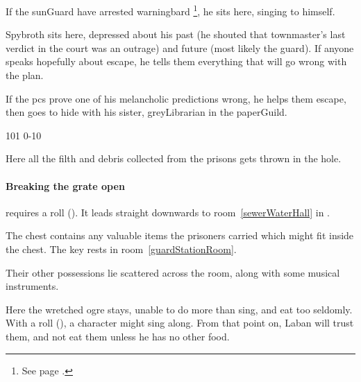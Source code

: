 \begin{multicols}{2}


If the \gls{sunGuard} have arrested \gls{warningbard}%
\footnote{See page \pageref{warningbard}.},
he sits here, singing to himself.


Spybroth sits here, depressed about his past (he shouted that \gls{townmaster}'s last verdict in the \gls{court} was an outrage) and future (most likely the \gls{guard}).
If anyone speaks hopefully about escape, he tells them everything that will go wrong with the plan.

If the \glspl{pc} prove one of his melancholic predictions wrong, he helps them escape, then goes to hide with his sister, \gls{greyLibrarian} in the \gls{paperGuild}.


%
  {{1}{0}{1}}%
  {{0}{-1}{0}}%
  {%
  }%
  {}%
  {\lootSmall}%
  {}%

\label{spyBroth}


Here all the filth and debris collected from the prisons gets thrown in the hole.

\paragraph{Breaking the grate open}
requires a  roll (\tn[10]).
It leads straight downwards to room~\vref{sewerWaterHall} in .


The chest contains any valuable items the prisoners carried which might fit inside the chest.
The key rests in room~\ref{guardStationRoom}.

Their other possessions lie scattered across the room, along with some musical instruments.


Here the wretched \gls{ogre} stays, unable to do more than sing, and eat too seldomly.
With a  roll (\tn[12]), a character might sing along.
From that point on, Laban will trust them, and not eat them unless he has no other food.


\end{multicols}
